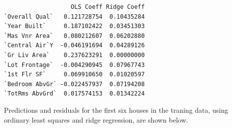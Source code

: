 \documentclass[
  letterpaper,
  DIV=11,
  numbers=noendperiod]{scrreprt}
\newenvironment{Shaded}{\begin{snugshade}}{\end{snugshade}}
\newcommand{\AttributeTok}[1]{\textcolor[rgb]{0.40,0.45,0.13}{#1}}
\newcommand{\DecValTok}[1]{\textcolor[rgb]{0.68,0.00,0.00}{#1}}
\newcommand{\FunctionTok}[1]{\textcolor[rgb]{0.28,0.35,0.67}{#1}}
\newcommand{\NormalTok}[1]{\textcolor[rgb]{0.00,0.23,0.31}{#1}}
\newcommand{\OtherTok}[1]{\textcolor[rgb]{0.00,0.23,0.31}{#1}}
\newcommand{\SpecialCharTok}[1]{\textcolor[rgb]{0.37,0.37,0.37}{#1}}
\newcommand{\StringTok}[1]{\textcolor[rgb]{0.13,0.47,0.30}{#1}}
\begin{document}
\begin{verbatim}
                   OLS Coeff Ridge Coeff
`Overall Qual`   0.121728754  0.10435284
`Year Built`     0.187102422  0.03451303
`Mas Vnr Area`   0.080212607  0.06202880
`Central Air`Y  -0.046191694  0.04289126
`Gr Liv Area`    0.237623291  0.00000000
`Lot Frontage`  -0.004290945  0.07967743
`1st Flr SF`     0.069910650  0.01020597
`Bedroom AbvGr` -0.022457937  0.07194208
`TotRms AbvGrd`  0.017574153  0.01342224
\end{verbatim}

Predictions and residuals for the first six houses in the traning data,
using ordinary least squares and ridge regression, are shown below.

\begin{Shaded}
\end{Shaded}

\begin{Shaded}
\end{Shaded}
\end{document}
